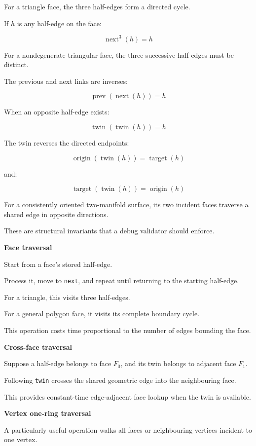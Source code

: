 For a triangle face, the three half-edges form a directed cycle.

If \(h\) is any half-edge on the face:

\[
\boxed{ \operatorname{next}^3(h)=h }
\]

For a nondegenerate triangular face, the three successive half-edges must be distinct.

The previous and next links are inverses:

\[
\boxed{ \operatorname{prev}(\operatorname{next}(h))=h }
\]

When an opposite half-edge exists:

\[
\boxed{ \operatorname{twin}(\operatorname{twin}(h))=h }
\]

The twin reverses the directed endpoints:

\[
\operatorname{origin}(\operatorname{twin}(h)) = \operatorname{target}(h)
\]

and:

\[
\operatorname{target}(\operatorname{twin}(h)) = \operatorname{origin}(h)
\]

For a consistently oriented two-manifold surface, its two incident faces traverse a shared edge in opposite directions.

These are structural invariants that a debug validator should enforce.

\textbf{Face traversal}

Start from a face's stored half-edge.

Process it, move to \texttt{next}, and repeat until returning to the starting half-edge.

For a triangle, this visits three half-edges.

For a general polygon face, it visits its complete boundary cycle.

This operation costs time proportional to the number of edges bounding the face.

\textbf{Cross-face traversal}

Suppose a half-edge belongs to face \(F_0\), and its twin belongs to adjacent face \(F_1\).

Following \texttt{twin} crosses the shared geometric edge into the neighbouring face.

This provides constant-time edge-adjacent face lookup when the twin is available.

\textbf{Vertex one-ring traversal}

A particularly useful operation walks all faces or neighbouring vertices incident to one vertex.

